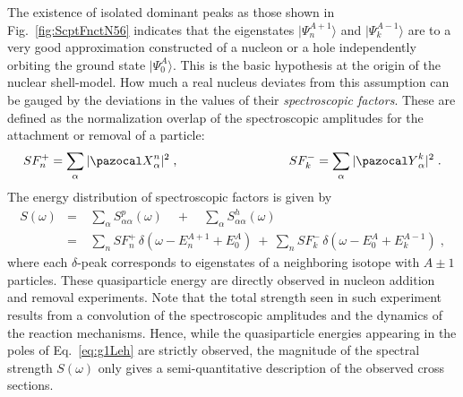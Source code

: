 The existence of isolated dominant peaks  as those shown in Fig.~\ref{fig:ScptFnctN56} indicates that the eigenstates $|\Psi^{A+1}_n\rangle$ and $|\Psi^{A-1}_k\rangle$ are to a very good approximation constructed of a nucleon or a hole independently orbiting the ground state $|\Psi^A_0\rangle$. This is the basic hypothesis at the origin of the nuclear shell-model.
 How much a real nucleus deviates from this assumption can be gauged by the deviations in the values of their {\em spectroscopic factors}. These are defined
 as the normalization overlap of the spectroscopic amplitudes for the attachment or removal of a particle:
\begin{eqnarray}
  SF_n^+=   \sum_\alpha  |{\pazocal X}^n_\alpha|^2 \; ,
 \qquad \qquad && \qquad \qquad 
  SF_k^- =  \sum_\alpha  |{\pazocal Y}^k_\alpha|^2 \; .
\label{eq:SFdef}
\end{eqnarray}
The energy distribution of spectroscopic factors is given by
\begin{eqnarray}
  S(\omega) &=& ~ \sum_\alpha S^p_{\alpha \alpha}(\omega) \quad + \quad \sum_\alpha S^h_{\alpha \alpha}(\omega)  \nonumber \\
          &=& ~ \sum_n  SF_n^+ \, \delta( \omega - E^{A+1}_n + E^A_0) 
          ~+~  \sum_n  SF_k^- \, \delta( \omega - E^A_0 + E^{A-1}_k ) \; ,
\label{eq:SFvsE}
\end{eqnarray}
where each $\delta$-peak corresponds to eigenstates of a neighboring isotope with $A\pm1$ particles. These quasiparticle energy are directly observed in nucleon addition and removal experiments.
%
Note that the total strength  seen in such experiment results from a convolution of the spectroscopic amplitudes and the dynamics of the reaction mechanisms. Hence, while the quasiparticle energies appearing in the poles of Eq.~\eqref{eq:g1Leh} are strictly observed, the magnitude of the spectral strength $S(\omega)$ only gives a semi-quantitative description of the observed cross sections.




